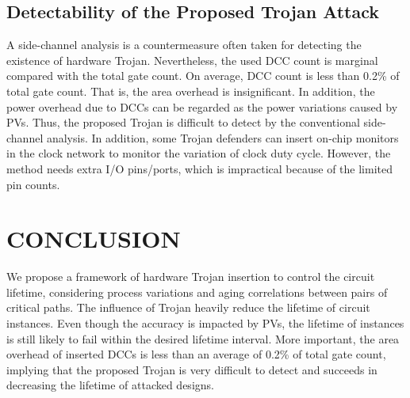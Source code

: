 \subsection{Detectability of the Proposed Trojan Attack}
\label{sec:exp:det}
A side-channel analysis is a countermeasure often taken for detecting the existence of hardware Trojan. Nevertheless, the used DCC count is marginal compared with the total gate count. On average, DCC count is less than 0.2\% of total gate count. That is, the area overhead is insignificant. In addition, the power overhead due to DCCs can be regarded as the power variations caused by PVs. Thus, the proposed Trojan is difficult to detect by the conventional side-channel analysis. In addition, some Trojan defenders can insert on-chip monitors in the clock network to monitor the variation of clock duty cycle. However, the method needs extra I/O pins/ports, which is impractical because of the limited pin counts.%


\section{CONCLUSION}
We propose a framework of hardware Trojan insertion to control the circuit lifetime, considering process variations and aging correlations between pairs of critical paths. The influence of Trojan heavily reduce the lifetime of circuit instances. Even though the accuracy is impacted by PVs, the lifetime of instances is still likely to fail within the desired lifetime interval. More important, the area overhead of inserted DCCs is less than an average of 0.2\% of total gate count, implying that the proposed Trojan is very difficult to detect and succeeds in decreasing the lifetime of attacked designs.
